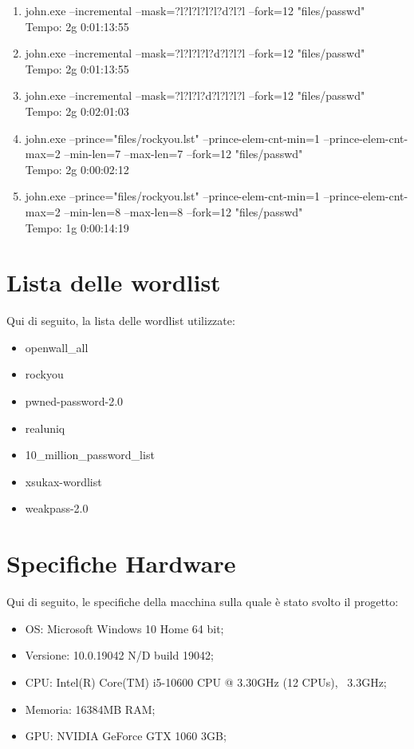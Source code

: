 \documentclass[11pt]{article} %
\begin{document}
\begin{enumerate}
{Tempo: 3g 0:00:36:45}
\item{john.exe --incremental --mask=?l?l?l?l?l?d?l?l --fork=12 "files/passwd"\\
Tempo: 2g 0:01:13:55}
\item{john.exe --incremental --mask=?l?l?l?l?d?l?l?l --fork=12 "files/passwd"\\
Tempo: 2g 0:01:13:55}
\item{john.exe --incremental --mask=?l?l?l?d?l?l?l?l --fork=12 "files/passwd"\\
Tempo: 2g 0:02:01:03}
\item{john.exe --prince="files/rockyou.lst" --prince-elem-cnt-min=1 --prince-elem-cnt-max=2 --min-len=7 --max-len=7 --fork=12 "files/passwd"\\
Tempo: 2g 0:00:02:12}
\item{john.exe --prince="files/rockyou.lst" --prince-elem-cnt-min=1 --prince-elem-cnt-max=2 --min-len=8 --max-len=8 --fork=12 "files/passwd"\\
Tempo: 1g 0:00:14:19}
\end{enumerate}

\section{Lista delle wordlist}
Qui di seguito, la lista delle wordlist utilizzate:
\begin{itemize}
\item{openwall\_all}
\item{rockyou}
\item{pwned-password-2.0}
\item{realuniq}
\item{10\_million\_password\_list}
\item{xsukax-wordlist}
\item{weakpass-2.0}
\end{itemize}

\section{Specifiche Hardware}
Qui di seguito, le specifiche della macchina sulla quale è stato svolto il progetto:
\begin{itemize}
\item{OS: Microsoft Windows 10 Home 64 bit;}
\item{Versione: 10.0.19042 N/D build 19042;}
\item{CPU: Intel(R) Core(TM) i5-10600 CPU @ 3.30GHz (12 CPUs), ~3.3GHz;}
\item{Memoria: 16384MB RAM;}
\item{GPU: NVIDIA GeForce GTX 1060 3GB;}
\end{itemize}
\end{document}
